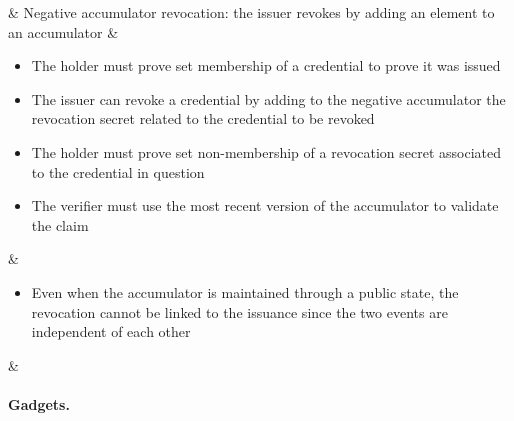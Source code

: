 {\begin{landscape}
\begin{funcprivtabular}{.1827}{.3027}{.3027}{.3027}{.1}
	& Negative accumulator revocation: the issuer revokes by adding an element to an accumulator
	& \begin{itemize}
		\item The holder must prove set membership of a credential to prove it was issued
		\item The issuer can revoke a credential by adding to the negative accumulator the revocation secret related to the credential to be revoked
		\item The holder must prove set non-membership of a revocation secret 	
		associated to the credential in question
		\item The verifier must use the most recent version of the accumulator to validate the claim
		\end{itemize}
	& \begin{itemize}
		\item Even when the accumulator is maintained through a public state, the revocation cannot be linked to the issuance since the two events are independent of each other
		\end{itemize}
	& \rowend
\hline
\end{funcprivtabular}

\end{landscape}
} %

\paragraph{Gadgets.}


